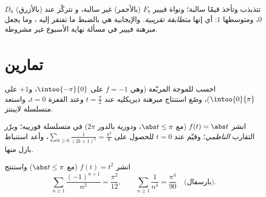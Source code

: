 \begin{omfigure}

{\small {} $D_8$ (بالأزرق) تتذبذب وتأخذ
قيمًا سالبة؛ ونواة فييير $F_8$ (بالأحمر) غير سالبة، و
تتركّز عند $0$، ومتوسطها $1$: أي إنها \emph{متطابقة
تقريبية}. والإيجابية هي بالضبط ما تفتقر إليه ،
وما يجعل مبرهنة فييير في مسألة نهاية الأسبوع
غير مشروطة.}
\end{omfigure}

\section{تمارين}

\begin{exercise}[$\star$]\label{exo:b2:fourier:1}
احسب  للموجة المربّعة (وهي $f = -1$ على
$\intoo{-\pi}{0}$، و$+1$ على $\intoo{0}{\pi}$)، وصُغ استنتاج مبرهنة
ديريكليه عند $t = \frac\pi2$ وعند القفزة $t = 0$، واستعد
متسلسلة لايبنتز.
\end{exercise}

\begin{exercise}[$\star$]\label{exo:b2:fourier:2}
انشر $f(t) = \abs t$ (مع $\abs t \leq \pi$، ودورية بالدور $2\pi$) في
متسلسلة فورييه؛ وبرّر التقارب \emph{الناظمي}؛ وقيّم عند $t =
0$ للحصول على $\sum_{k\geq0}\frac{1}{(2k+1)^2} = \frac{\pi^2}{8}$،
وأعد استنباط بازل منها.
\end{exercise}

\begin{exercise}[$\star$]\label{exo:b2:fourier:3}
انشر $f(t) = t^2$ (مع $\abs t \leq \pi$) واستنتج
\[
\sum_{n\geq1}\frac{(-1)^{n+1}}{n^2} = \frac{\pi^2}{12},
\qquad
\sum_{n\geq1}\frac{1}{n^4} = \frac{\pi^4}{90}
\quad\text{(بارسفال)}.
\]
\end{exercise}

